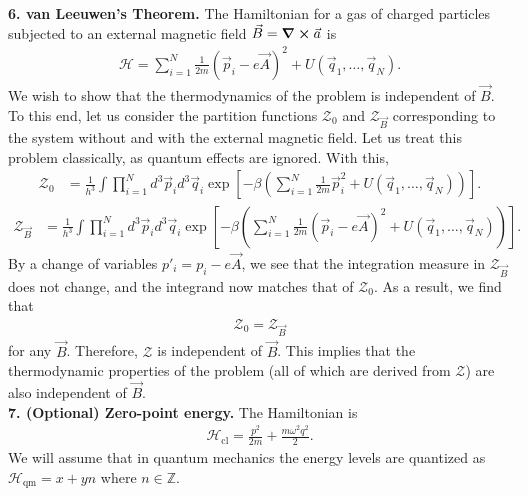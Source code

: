 \documentclass{article}
\theoremstyle{definition}
\newcommand{\ham}{\mathcal{H}}
\newcommand{\be}{\beta}
\newcommand{\f}[2]{\frac{#1}{#2}}
\newcommand{\lp}{\left(}
\newcommand{\rp}{\right)}
\newcommand{\lb}{\left[}
\newcommand{\rb}{\right]}
\begin{document}
\noindent \textbf{6. van Leeuwen's Theorem.} The Hamiltonian for a gas of charged particles subjected to an external magnetic field $\vec{B} = \curl \vec{a}$ is 
\begin{align*}
\ham = \sum^N_{i=1} \f{1}{2m}(\vec{p}_i - e\vec{A})^2 + U(\vec{q}_1, \dots, \vec{q}_N).
\end{align*}
We wish to show that the thermodynamics of the problem is independent of $\vec{B}$. To this end, let us consider the partition functions $\mathcal{Z}_0$ and $\mathcal{Z}_{\vec{B}}$ corresponding to the system without and with the external magnetic field. Let us treat this problem classically, as quantum effects are ignored. With this, 
\begin{align*}
\mathcal{Z}_0 
&= \f{1}{h^3} \int \prod^N_{i=1} d^3\vec{p}_i d^3 \vec{q}_i \exp\lb -\be \lp 
\sum^N_{i=1} \f{1}{2m}\vec{p}_i^2 + U(\vec{q}_1, \dots, \vec{q}_N) \rp \rb.
\end{align*}
\begin{align*}
\mathcal{Z}_{\vec{B}}
&= \f{1}{h^3} \int \prod^N_{i=1} d^3\vec{p}_i d^3 \vec{q}_i \exp\lb -\be \lp 
\sum^N_{i=1} \f{1}{2m}(\vec{p}_i - e\vec{A})^2 + U(\vec{q}_1, \dots, \vec{q}_N) \rp \rb.
\end{align*}
By a change of variables $p'_i = p_i - e\vec{A}$, we see that the integration measure in $\mathcal{Z}_{\vec{B}}$ does not change, and the integrand now matches that of $\mathcal{Z}_0$. As a result, we find that
\begin{align*}
\mathcal{Z}_0 = \mathcal{Z}_{\vec{B}}
\end{align*}
for any $\vec{B}$. Therefore, $\mathcal{Z}$ is independent of $\vec{B}$. This implies that the thermodynamic properties of the problem (all of which are derived from $\mathcal{Z}$) are also independent of $\vec{B}$. \\ 




\noindent \textbf{7. (Optional) Zero-point energy.} The Hamiltonian is 
\begin{align*}
\ham_\text{cl} = \f{p^2}{2m} + \f{m\omega^2 q^2}{2}. 
\end{align*}
We will assume that in quantum mechanics the energy levels are quantized as $\ham_\text{qm} = x + yn$ where $n\in \mathbb{Z}$. 
\end{document}
